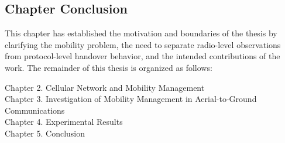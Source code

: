 \subsection{Chapter Conclusion}

This chapter has established the motivation and boundaries of the thesis by clarifying the mobility problem, the need to separate radio-level observations from protocol-level handover behavior, and the intended contributions of the work. The remainder of this thesis is organized as follows:

\noindent\hspace*{1cm}Chapter 2. Cellular Network and Mobility Management\\
\hspace*{1cm}Chapter 3. Investigation of Mobility Management in Aerial-to-Ground Communications\\
\hspace*{1cm}Chapter 4. Experimental Results\\
\hspace*{1cm}Chapter 5. Conclusion
